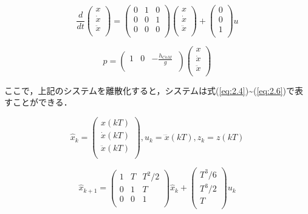 \begin{equation}
     \frac{d}{dt}\left(\begin{matrix}x\\\dot{x}\\\ddot{x}\\\end{matrix}\right)=\left(\begin{matrix}0&1&0\\0&0&1\\0&0&0\\\end{matrix}\right)\left(\begin{matrix}x\\\dot{x}\\\ddot{x}\\\end{matrix}\right)+\left(\begin{matrix}0\\0\\1\\\end{matrix}\right)u
     \label{eq:system1}
\end{equation}

\begin{equation}
     p=\left(\begin{matrix}1&0&-\frac{h_{CoM}}{g}\ \\\end{matrix}\right)\left(\begin{matrix}x\\\dot{x}\\\ddot{x}\\\end{matrix}\right)
     \label{eq:system2}
\end{equation}

ここで，上記のシステムを離散化すると，システムは式(\ref{eq:2.4})\~{}(\ref{eq:2.6})で表すことができる．

\begin{equation}
     \widehat{x}_k=\left(\begin{matrix}x\left(kT\right)\\\dot{x}\left(kT\right)\\\ddot{x}\left(kT\right)\\\end{matrix}\right),u_k=\dddot{x}\left(kT\right),z_k=z\left(kT\right)
     \label{eq:2.4}
\end{equation}

\begin{equation}
     \widehat{x}_{k+1}=\left(\begin{matrix}1&T&T^2/2\\0&1&T\\0&0&1\\\end{matrix}\right)\widehat{x}_k+\left(\begin{matrix}T^3/6\\T^3/2\\T\\\end{matrix}\right)u_k
     \label{eq:2.5}
\end{equation}

